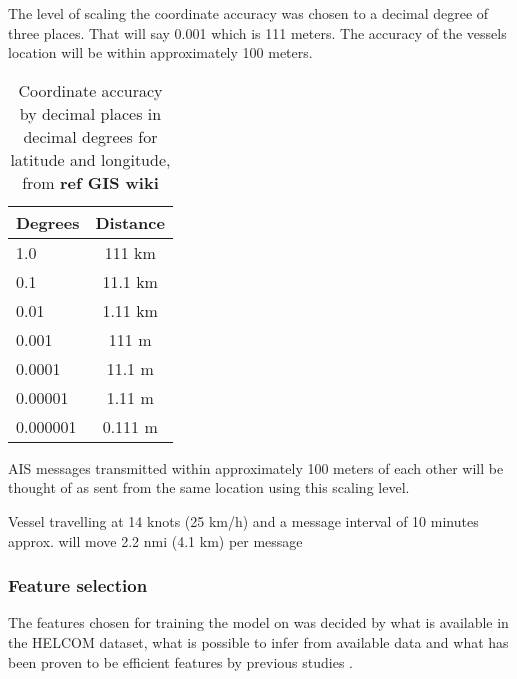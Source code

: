 \documentclass[../main.tex]{subfiles}
\begin{document}
The level of scaling the coordinate accuracy was chosen to a decimal degree of three places. That will say 0.001 which is 111 meters. The accuracy of the vessels location will be within approximately 100 meters.

\begin{table}[H]
\centering
\begin{tabular}{|l|c|}
\hline
\rowcolor[HTML]{C0C0C0} 
\textbf{Degrees} & \multicolumn{1}{l|}{\cellcolor[HTML]{C0C0C0}\textbf{Distance}} \\ \hline
1.0              & 111 km                                                         \\ \hline
0.1              & 11.1 km                                                        \\ \hline
0.01             & 1.11 km                                                        \\ \hline
0.001            & 111 m                                                          \\ \hline
0.0001           & 11.1 m                                                         \\ \hline
0.00001          & 1.11 m                                                         \\ \hline
0.000001          & 0.111 m                                                         \\ \hline
\end{tabular}
\caption{Coordinate accuracy by decimal places in decimal degrees for latitude and longitude, from \textbf{ref GIS wiki}}
\label{tab:gis-accuracy}
\end{table}

AIS messages transmitted within approximately 100 meters of each other will be thought of as sent from the same location using this scaling level.

Vessel travelling at 14 knots (25 km/h) and a message interval of 10 minutes approx. will move 2.2 nmi (4.1 km) per message

\subsubsection{Feature selection}

The features chosen for training the model on was decided by what is available in the HELCOM dataset, what is possible to infer from available data and what has been proven to be efficient features by previous studies \cite{El_2020, Jahn_2018}.
\end{document}
